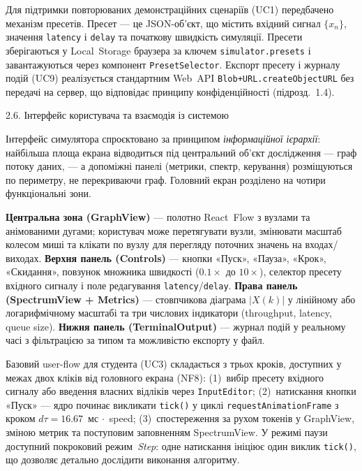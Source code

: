Для підтримки повторюваних демонстраційних сценаріїв (UC1) передбачено
механізм пресетів. Пресет --- це JSON-об'єкт, що містить вхідний
сигнал \(\{x_{n}\}\), значення \texttt{latency} і \texttt{delay} та
початкову швидкість симуляції. Пресети зберігаються у Local~Storage
браузера за ключем \texttt{simulator.presets} і завантажуються через
компонент \texttt{PresetSelector}. Експорт пресету і журналу подій (UC9)
реалізується стандартним Web~API \texttt{Blob+URL.createObjectURL} без
передачі на сервер, що відповідає принципу конфіденційності
(підрозд.~1.4).

\protect{}\label{_Toc228121473}{}2.6. Інтерфейс
користувача та взаємодія із системою

Інтерфейс симулятора спроєктовано за принципом \emph{інформаційної
ієрархії}: найбільша площа екрана відводиться під центральний об'єкт
дослідження --- граф потоку даних, --- а допоміжні панелі (метрики,
спектр, керування) розміщуються по периметру, не перекриваючи граф.
Головний екран розділено на чотири функціональні зони.

\textbf{Центральна зона (GraphView)} --- полотно React~Flow з вузлами та
анімованими дугами; користувач може перетягувати вузли, змінювати масштаб
колесом миші та клікати по вузлу для перегляду поточних значень на
входах/виходах. \textbf{Верхня панель (Controls)} --- кнопки «Пуск»,
«Пауза», «Крок», «Скидання», повзунок множника швидкості (\(0.1\times\)
до \(10\times\)), селектор пресету вхідного сигналу і поле редагування
\texttt{latency}/\texttt{delay}. \textbf{Права панель (SpectrumView +
Metrics)} --- стовпчикова діаграма \(|X(k)|\) у лінійному або
логарифмічному масштабі та три числових індикатори (throughput, latency,
queue size). \textbf{Нижня панель (TerminalOutput)} --- журнал подій у
реальному часі з фільтрацією за типом та можливістю експорту у файл.

Базовий user-flow для студента (UC3) складається з трьох кроків,
доступних у межах двох кліків від головного екрана (NF8):
(1)~вибір пресету вхідного сигналу або введення власних відліків через
\texttt{InputEditor};
(2)~натискання кнопки «Пуск» --- ядро починає викликати \texttt{tick()}
у циклі \texttt{requestAnimationFrame} з кроком \(d\tau=16.67\)~мс
\(\cdot\)~speed;
(3)~спостереження за рухом токенів у GraphView, зміною метрик та
поступовим заповненням SpectrumView. У режимі паузи доступний покроковий
режим~\emph{Step}: одне натискання ініціює один виклик \texttt{tick()},
що дозволяє детально дослідити виконання алгоритму.

